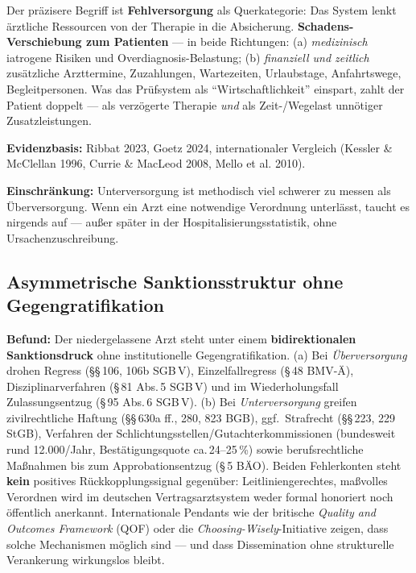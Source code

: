 \documentclass{umbruch-position}
\begin{document}
Der pr\"azisere Begriff ist \textbf{Fehlversorgung} als Querkategorie: Das System lenkt \"arztliche Ressourcen von der Therapie in die Absicherung. \textbf{Schadens-Verschiebung zum Patienten} --- in beide Richtungen: (a) \textit{medizinisch} iatrogene Risiken und Overdiagnosis-Belastung; (b) \textit{finanziell und zeitlich} zus\"atzliche Arzttermine, Zuzahlungen, Wartezeiten, Urlaubstage, Anfahrtswege, Begleitpersonen. Was das Prüfsystem als ``Wirtschaftlichkeit'' einspart, zahlt der Patient doppelt --- als verz\"ogerte Therapie \emph{und} als Zeit-/Wegelast unn\"otiger Zusatzleistungen.

\textbf{Evidenzbasis:} Ribbat 2023, Goetz 2024, internationaler Vergleich (Kessler \& McClellan 1996, Currie \& MacLeod 2008, Mello et al. 2010).

\textbf{Einschr\"ankung:} Unterversorgung ist methodisch viel schwerer zu messen als \"Uberversorgung. Wenn ein Arzt eine notwendige Verordnung unterl\"asst, taucht es nirgends auf --- au\ss{}er sp\"ater in der Hospitalisierungsstatistik, ohne Ursachenzuschreibung.

\subsection{Asymmetrische Sanktionsstruktur ohne Gegengratifikation}

\textbf{Befund:} Der niedergelassene Arzt steht unter einem \textbf{bidirektionalen Sanktionsdruck} ohne institutionelle Gegengratifikation. (a) Bei \emph{Überversorgung} drohen Regress (\S\S\,106, 106b SGB\,V), Einzelfallregress (\S\,48 BMV-\"A), Disziplinarverfahren (\S\,81 Abs.\,5 SGB\,V) und im Wiederholungsfall Zulassungsentzug (\S\,95 Abs.\,6 SGB\,V). (b) Bei \emph{Unterversorgung} greifen zivilrechtliche Haftung (\S\S\,630a ff., 280, 823 BGB), ggf.\ Strafrecht (\S\S\,223, 229 StGB), Verfahren der Schlichtungsstellen/Gutachterkommissionen (bundesweit rund 12.000/Jahr, Best\"atigungsquote ca.\,24--25\,\%) sowie berufsrechtliche Ma\ss{}nahmen bis zum Approbationsentzug (\S\,5 B\"AO). Beiden Fehlerkonten steht \textbf{kein} positives Rückkopplungssignal gegenüber: Leitlinien\-gerechtes, maßvolles Verordnen wird im deutschen Vertragsarztsystem weder formal honoriert noch \"offentlich anerkannt. Internationale Pendants wie der britische \emph{Quality and Outcomes Framework} (QOF) oder die \emph{Choosing-Wisely}-Initiative zeigen, dass solche Mechanismen möglich sind --- und dass Dissemination ohne strukturelle Verankerung wirkungslos bleibt.
\end{document}
